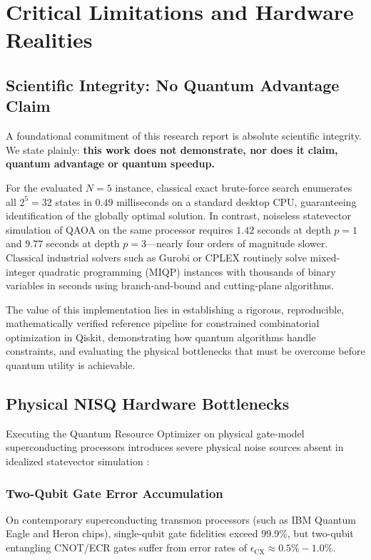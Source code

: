 \chapter{Critical Limitations and Hardware Realities}
\label{chap:limitations}

\section{Scientific Integrity: No Quantum Advantage Claim}
A foundational commitment of this research report is absolute scientific integrity. We state plainly: \textbf{this work does not demonstrate, nor does it claim, quantum advantage or quantum speedup.}

For the evaluated $N = 5$ instance, classical exact brute-force search enumerates all $2^5 = 32$ states in $0.49$ milliseconds on a standard desktop CPU, guaranteeing identification of the globally optimal solution. In contrast, noiseless statevector simulation of QAOA on the same processor requires $1.42$ seconds at depth $p=1$ and $9.77$ seconds at depth $p=3$---nearly four orders of magnitude slower. Classical industrial solvers such as Gurobi or CPLEX routinely solve mixed-integer quadratic programming (MIQP) instances with thousands of binary variables in seconds using branch-and-bound and cutting-plane algorithms.

The value of this implementation lies in establishing a rigorous, reproducible, mathematically verified reference pipeline for constrained combinatorial optimization in Qiskit, demonstrating how quantum algorithms handle constraints, and evaluating the physical bottlenecks that must be overcome before quantum utility is achievable.

\section{Physical NISQ Hardware Bottlenecks}
Executing the Quantum Resource Optimizer on physical gate-model superconducting processors introduces severe physical noise sources absent in idealized statevector simulation \cite{preskill2018quantum, sachdeva2024quantum}:

\subsection{Two-Qubit Gate Error Accumulation}
On contemporary superconducting transmon processors (such as IBM Quantum Eagle and Heron chips), single-qubit gate fidelities exceed $99.9\%$, but two-qubit entangling CNOT/ECR gates suffer from error rates of $\epsilon_{\text{CX}} \approx 0.5\% - 1.0\%$.

